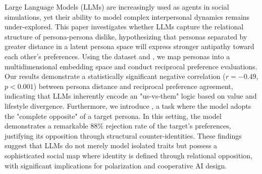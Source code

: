 Large Language Models (LLMs) are increasingly used as agents in social simulations, yet their ability to model complex interpersonal dynamics remains under-explored. This paper investigates whether LLMs capture the relational structure of persona-persona dislike, hypothesizing that personas separated by greater distance in a latent persona space will express stronger antipathy toward each other's preferences. Using the \dataset dataset and \gpt, we map personas into a multidimensional embedding space and conduct reciprocal preference evaluations. Our results demonstrate a statistically significant negative correlation ($r = -0.49$, $p < 0.001$) between persona distance and reciprocal preference agreement, indicating that LLMs inherently encode an "us-vs-them" logic based on value and lifestyle divergence. Furthermore, we introduce \schismogenesis, a task where the model adopts the "complete opposite" of a target persona. In this setting, the model demonstrates a remarkable 88\% rejection rate of the target's preferences, justifying its opposition through structural counter-identities. These findings suggest that LLMs do not merely model isolated traits but possess a sophisticated social map where identity is defined through relational opposition, with significant implications for polarization and cooperative AI design.
